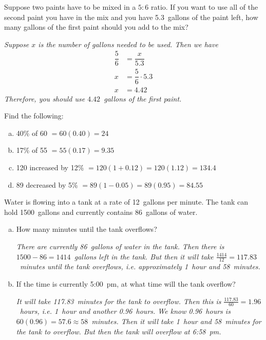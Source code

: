 \documentclass[11pt,letterpaper]{article}
\begin{document}
\newpage





 Suppose two paints have to be mixed in a $5 : 6$ ratio. If you want to use all of the second paint you have in the mix and you have 5.3~gallons of the paint left, how many gallons of the first paint should you add to the mix? \pspace

{\itshape Suppose $x$ is the number of gallons needed to be used. Then we have
	\[
	\begin{aligned}
	\dfrac{5}{6}&= \dfrac{x}{5.3} \\
	x&= \dfrac{5}{6} \cdot 5.3 \\
	x&= 4.42
	\end{aligned}	
	\]
Therefore, you should use $4.42$~gallons of the first paint. 
} \pvspace{0.5cm}





 Find the following:
\begin{enumerate}[(a)]
\item 40\% of 60 $= 60(0.40)= 24$ \pvspace{1cm}
\item 17\% of 55 $= 55(0.17)= 9.35$\pvspace{1cm}
\item 120 increased by 12\% $= 120(1+0.12)= 120(1.12)= 134.4$ \pvspace{1cm}
\item 89 decreased by 5\% $= 89(1- 0.05)= 89(0.95)= 84.55$ \pvspace{1cm}
\end{enumerate} \pspace





 Water is flowing into a tank at a rate of 12~gallons per minute. The tank can hold 1500~gallons and currently contains 86~gallons of water. 
\begin{enumerate}[(a)]
\item How many minutes until the tank overflows? \pspace

{\itshape There are currently 86~gallons of water in the tank. Then there is $1500 - 86= 1414$~gallons left in the tank. But then it will take $\frac{1414}{12}= 117.83$~minutes until the tank overflows, i.e. approximately 1~hour and 58~minutes.} \pvspace{0.6cm}

\item If the time is currently 5:00~pm, at what time will the tank overflow? \pspace

{\itshape It will take 117.83~minutes for the tank to overflow. Then this is $\frac{117.83}{60}= 1.96$~hours, i.e. 1~hour and another 0.96~hours. We know 0.96~hours is $60(0.96)= 57.6 \approx 58$~minutes. Then it will take 1~hour and 58~minutes for the tank to overflow. But then the tank will overflow at 6:58~pm.
}
\end{enumerate}
\end{document}
